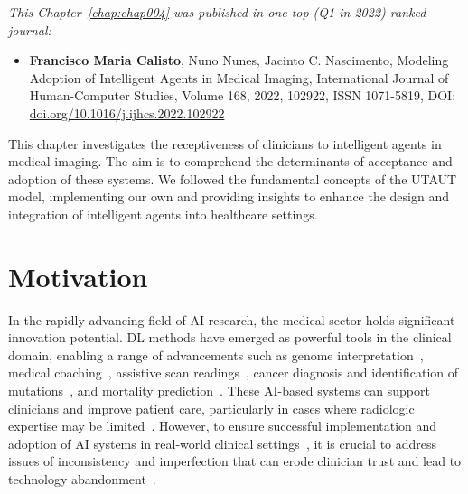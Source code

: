 \clearpage
\label{chap:chap004}

\vspace{0.5mm}

\noindent
{\it This Chapter~\ref{chap:chap004} was published in one top (Q1 in 2022) ranked journal:}

\vspace{0.5mm}

\begin{itemize}
\item {\bf Francisco Maria Calisto}, Nuno Nunes, Jacinto C. Nascimento, Modeling Adoption of Intelligent Agents in Medical Imaging, International Journal of Human-Computer Studies, Volume 168, 2022, 102922, ISSN 1071-5819, DOI: \href{https://doi.org/10.1016/j.ijhcs.2022.102922}{doi.org/10.1016/j.ijhcs.2022.102922}
\end{itemize}

This chapter investigates the receptiveness of clinicians to intelligent agents in medical imaging.
The aim is to comprehend the determinants of acceptance and adoption of these systems.
We followed the fundamental concepts of the \ac{UTAUT} model, implementing our own and providing insights to enhance the design and integration of intelligent agents into healthcare settings.

\section{Motivation}
\label{sec:chap004001}

In the rapidly advancing field of \ac{AI} research, the medical sector holds significant innovation potential.
\ac{DL} methods have emerged as powerful tools in the clinical domain, enabling a range of advancements such as genome interpretation~\cite{sundaram2018predicting}, medical coaching~\cite{CALISTO2022102285}, assistive scan readings~\cite{madani2018deep}, cancer diagnosis and identification of mutations~\cite{coudray2018classification}, and mortality prediction~\cite{ahmad2018death}.
These \ac{AI}-based systems can support clinicians and improve patient care, particularly in cases where radiologic expertise may be limited~\cite{doi:10.1148/radiol.2020201874, doi:10.1148/radiol.2020190283}.
However, to ensure successful implementation and adoption of \ac{AI} systems in real-world clinical settings~\cite{Kocielnik:2019:YAI:3290605.3300641}, it is crucial to address issues of inconsistency and imperfection that can erode clinician trust and lead to technology abandonment~\cite{CALISTO2021102607, CALISTO2022102285}.

